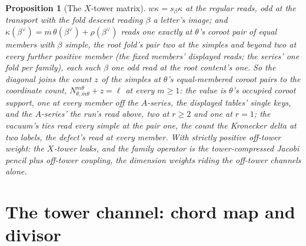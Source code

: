 \documentclass[11pt]{article}
\newtheorem{proposition}{Proposition}
\theoremstyle{definition}
\begin{document}
\begin{proposition}[The $X$-tower matrix]
$w\kappa=s_\beta\kappa$ at the regular reads, odd at the
transport with the fold descent reading $\beta$ a letter's
image; and
$\kappa(\beta^\vee)=m\,\theta(\beta^\vee)+\rho(\beta^\vee)$
reads one exactly at $\theta$'s coroot pair of equal members
with $\beta$ simple, the root fold's pair two at the simples and
beyond two at every further positive member (the fixed members'
displayed reads; the series' one fold per family), each such
$\beta$ one odd read at the root content's one. So the diagonal
joins the count $z$ of the simples at $\theta$'s equal-membered
coroot pairs to the
coordinate count, $N^{m\theta}_{\theta,m\theta}+z=\ell$ at
every $m\ge1$: the value is $\theta$'s occupied coroot support,
one at every member off the $A$-series, the displayed tables'
single keys, and the $A$-series' the run's read above, two at
$r\ge2$ and one at $r=1$; the
vacuum's ties read every simple at the pair one, the count the
Kronecker delta at two labels, the defect's read at every
member.
With strictly positive off-tower weight: the $X$-tower leaks, and the
family operator is the tower-compressed Jacobi pencil plus off-tower
coupling, the dimension weights riding the off-tower channels alone.
\end{proposition}

\section{The tower channel: chord map and divisor}\label{sec:channel}
\end{document}
